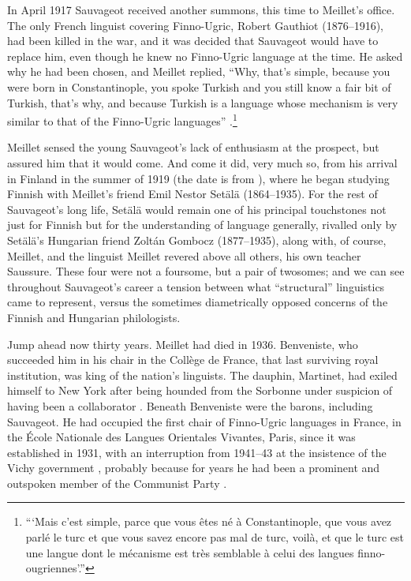 \documentclass[output=paper]{langscibook}
\begin{document}
In April 1917 Sauvageot received another summons, this time to Meillet's office. The only French linguist covering Finno-Ugric, Robert Gauthiot (1876--1916), had been killed in the war, and it was decided that Sauvageot would have to replace him, even though he knew no Finno-Ugric language at the time. He asked why he had been chosen, and Meillet replied, ``Why, that's simple, because you were born in Constantinople, you spoke Turkish and you still know a fair bit of Turkish, that's why, and because Turkish is a language whose mechanism is very similar to that of the Finno-Ugric languages'' \citep[194]{Sauvageot1992}.\footnote{```Mais c'est simple, parce que vous êtes né à Constantinople, que vous avez parlé le turc et que vous savez encore pas mal de turc, voilà, et que le turc est une langue dont le mécanisme est très semblable à celui des langues finno-ougriennes'.''}

Meillet sensed the young Sauvageot's lack of enthusiasm at the prospect, but assured him that it would come. And come it did, very much so, from his arrival in Finland in the summer of 1919 (the date is from \citealt[296]{Perrot2007}), where he began studying Finnish with Meillet's friend Emil Nestor Setälä (1864--1935). For the rest of Sauvageot's long life, Setälä would remain one of his principal touchstones not just for Finnish but for the understanding of language generally, rivalled only by Setälä's Hungarian friend Zoltán Gombocz (1877--1935), along with, of course, Meillet, and the linguist Meillet revered above all others, his own teacher Saussure. These four were not a foursome, but a pair of twosomes; and we can see throughout Sauvageot's career a tension between what ``structural'' linguistics came to represent, versus the sometimes diametrically opposed concerns of the Finnish and Hungarian philologists.

Jump ahead now thirty years. Meillet had died in 1936. Benveniste, who succeeded him in his chair in the Collège de France, that last surviving royal institution, was king of the nation's linguists. The dauphin, Martinet, had exiled himself to New York after being hounded from the Sorbonne under suspicion of having been a collaborator \citep[see][]{Joseph2016}. Beneath Benveniste were the barons, including Sauvageot. He had occupied the first chair of Finno-Ugric languages in France, in the École Nationale des Langues Orientales Vivantes, Paris, since it was established in 1931, with an interruption from 1941--43 at the insistence of the Vichy government \citep[296]{Perrot2007}, probably because for years he had been a prominent and outspoken member of the Communist Party \citep[see][158]{Chevalier2006}.
\end{document}
